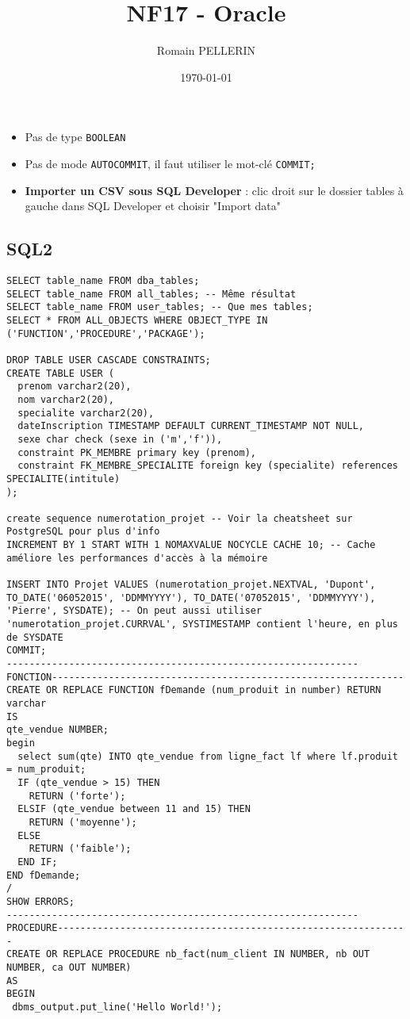 \documentclass[11pt,a4paper,oneside,french,svgnames]{report}
\title{NF17 - Oracle}
\author{Romain PELLERIN}
\date\today
\newcommand{\code}[2]{\lstset{
  language=#2,
  title={{\setlength{\fboxsep}{1pt}\fcolorbox{orange}{yellow!20}{\sffamily\scriptsize
              \textcolor{gray!10}{\_}{#1}\textcolor{gray!10}{\_}}}}
  }
}
\begin{document}
\scriptsize

\begin{itemize}
  \item Pas de type \lstinline{BOOLEAN}
  \item Pas de mode \lstinline{AUTOCOMMIT}, il faut utiliser le mot-clé \lstinline{COMMIT;}
  \item \textbf{Importer un CSV sous SQL Developer} : clic droit sur le dossier tables à gauche dans SQL Developer et choisir "Import data"
\end{itemize}

\subsection*{SQL2}
\code{PL/SQL}{SQL}
\begin{lstlisting}
SELECT table_name FROM dba_tables;
SELECT table_name FROM all_tables; -- Même résultat
SELECT table_name FROM user_tables; -- Que mes tables;
SELECT * FROM ALL_OBJECTS WHERE OBJECT_TYPE IN ('FUNCTION','PROCEDURE','PACKAGE');

DROP TABLE USER CASCADE CONSTRAINTS;
CREATE TABLE USER ( 
  prenom varchar2(20), 
  nom varchar2(20), 
  specialite varchar2(20), 
  dateInscription TIMESTAMP DEFAULT CURRENT_TIMESTAMP NOT NULL,
  sexe char check (sexe in ('m','f')),
  constraint PK_MEMBRE primary key (prenom),
  constraint FK_MEMBRE_SPECIALITE foreign key (specialite) references SPECIALITE(intitule)
);

create sequence numerotation_projet -- Voir la cheatsheet sur PostgreSQL pour plus d'info
INCREMENT BY 1 START WITH 1 NOMAXVALUE NOCYCLE CACHE 10; -- Cache améliore les performances d'accès à la mémoire

INSERT INTO Projet VALUES (numerotation_projet.NEXTVAL, 'Dupont', TO_DATE('06052015', 'DDMMYYYY'), TO_DATE('07052015', 'DDMMYYYY'), 'Pierre', SYSDATE); -- On peut aussi utiliser 'numerotation_projet.CURRVAL', SYSTIMESTAMP contient l'heure, en plus de SYSDATE
COMMIT;
--------------------------------------------------------------FONCTION--------------------------------------------------------------
CREATE OR REPLACE FUNCTION fDemande (num_produit in number) RETURN varchar
IS
qte_vendue NUMBER;
begin
  select sum(qte) INTO qte_vendue from ligne_fact lf where lf.produit = num_produit;
  IF (qte_vendue > 15) THEN
    RETURN ('forte');
  ELSIF (qte_vendue between 11 and 15) THEN
    RETURN ('moyenne');
  ELSE
    RETURN ('faible');
  END IF;
END fDemande;
/
SHOW ERRORS;
--------------------------------------------------------------PROCEDURE--------------------------------------------------------------
CREATE OR REPLACE PROCEDURE nb_fact(num_client IN NUMBER, nb OUT NUMBER, ca OUT NUMBER)
AS
BEGIN
 dbms_output.put_line('Hello World!');
 

\end{lstlisting}
\end{document}
